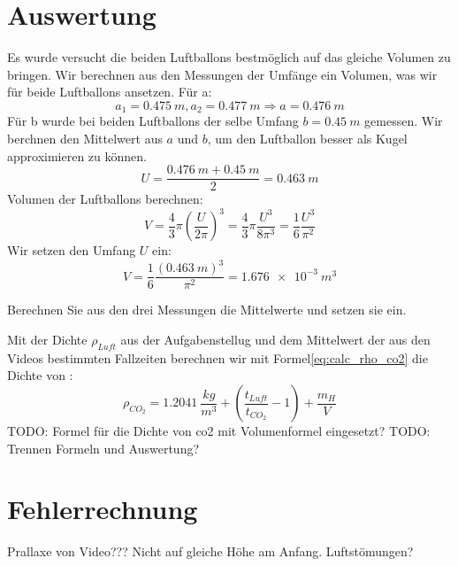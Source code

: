 \documentclass{article}
\begin{document}
    \section{Auswertung}
        Es wurde versucht die beiden Luftballons bestmöglich auf das gleiche Volumen zu bringen.
        Wir berechnen aus den Messungen der Umfänge ein Volumen, was wir für beide Luftballons ansetzen.
        Für a:
        \begin{equation}
            a_1 = \SI{0.475}{m}, a_2 = \SI{0.477}{m} \Rightarrow a = \SI{0.476}{m} 
        \end{equation}
        Für b wurde bei beiden Luftballons der selbe Umfang \(b = \SI{0.45}{m} \) gemessen.
        Wir berchnen den Mittelwert aus \(a\) und \(b\), um den Luftballon besser als Kugel approximieren zu können.
        \begin{equation}
            U = \frac{ \SI{0.476}{m} + \SI{0.45}{m} }{2} = \SI{0.463}{m}
        \end{equation}
        Volumen der Luftballons berechnen:
        \begin{equation} \label{eq:volumen}
            V = \frac{4}{3} \pi {\left( \frac{U}{2 \pi} \right) }^3 = \frac{4}{3} \pi \frac{U^3}{8 \pi^3} = \frac{1}{6} \frac{U^3}{\pi^2}
        \end{equation}
        Wir setzen den Umfang \(U\) ein:
        \begin{equation}
            V =  \frac{1}{6} \frac{{(\SI{0.463}{m})}^3}{\pi^2} = \SI{1.676e-3}{m^3}
        \end{equation}
        
        Berechnen Sie aus den drei Messungen die Mittelwerte und setzen sie ein.

        Mit der Dichte \(\rho_{Luft}\) aus der Aufgabenstellug\cite{Aufgabenstellung}
        und dem Mittelwert der aus den Videos bestimmten Fallzeiten berechnen wir mit Formel\ref{eq:calc_rho_co2} die Dichte von :
        \begin{equation}
            \rho_{CO_2} = \SI{1.2041}{\frac{kg}{m^3}} + (\frac{t_{Luft}}{t_{CO_2}} - 1)+\frac{m_H}{V}
        \end{equation}
        TODO: Formel für die Dichte von co2 mit Volumenformel eingesetzt?
        TODO: Trennen Formeln und Auswertung?

    \section{Fehlerrechnung}
        Prallaxe von Video???
        Nicht auf gleiche Höhe am Anfang.
        Luftstömungen?
        
\end{document}
